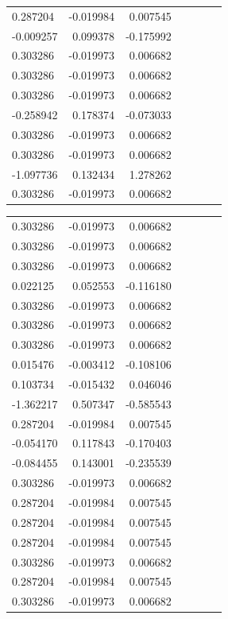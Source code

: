 \documentclass[a4paper,twoside,12pt]{book}
\begin{document}
\begin{appendices}
\begin{table}
\begin{tabular}{lrrrrrr}
	 0.287204 & -0.019984 &  0.007545 \\
	-0.009257 &  0.099378 & -0.175992 \\
	 0.303286 & -0.019973 &  0.006682 \\
	 0.303286 & -0.019973 &  0.006682 \\
	 0.303286 & -0.019973 &  0.006682 \\
	-0.258942 &  0.178374 & -0.073033 \\
	 0.303286 & -0.019973 &  0.006682 \\
	 0.303286 & -0.019973 &  0.006682 \\
	-1.097736 &  0.132434 &  1.278262 \\
	 0.303286 & -0.019973 &  0.006682 \\
	 \bottomrule
	\end{tabular}		
\end{table}
\begin{table}
	\centering
	\begin{tabular}{lrrrrrr}
		\toprule
	 0.303286 & -0.019973 &  0.006682 \\
	 0.303286 & -0.019973 &  0.006682 \\
	 0.303286 & -0.019973 &  0.006682 \\
	 0.022125 &  0.052553 & -0.116180 \\
	 0.303286 & -0.019973 &  0.006682 \\
	 0.303286 & -0.019973 &  0.006682 \\
	 0.303286 & -0.019973 &  0.006682 \\
	 0.015476 & -0.003412 & -0.108106 \\
	 0.103734 & -0.015432 &  0.046046 \\
	-1.362217 &  0.507347 & -0.585543 \\
	 0.287204 & -0.019984 &  0.007545 \\
	-0.054170 &  0.117843 & -0.170403 \\
	-0.084455 &  0.143001 & -0.235539 \\
	 0.303286 & -0.019973 &  0.006682 \\
	 0.287204 & -0.019984 &  0.007545 \\
	 0.287204 & -0.019984 &  0.007545 \\
	 0.287204 & -0.019984 &  0.007545 \\
	 0.303286 & -0.019973 &  0.006682 \\
	 0.287204 & -0.019984 &  0.007545 \\
	 0.303286 & -0.019973 &  0.006682 \\

\end{tabular}
\end{table}
\end{appendices}
\end{document}
